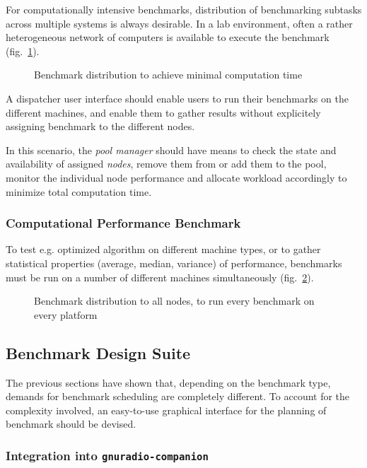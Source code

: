 \documentclass[a4paper]{IEEEtran}
\begin{document}
For computationally intensive benchmarks, distribution of benchmarking subtasks
across multiple systems is always desirable. In a lab environment, often a
rather heterogeneous network of computers is available to execute the benchmark
(fig.~\ref{fig:minimizetime}).

\begin{figure}[h] \small\centering 
\caption{\label{fig:minimizetime}Benchmark distribution to achieve minimal
computation time} \end{figure}

A dispatcher user interface should enable users to run their benchmarks on the
different machines, and enable them to gather results without explicitely
assigning benchmark to the different nodes.

In this scenario, the \emph{pool manager} should have means to check the state
and availability of assigned \emph{nodes}, remove them from or add them to the
pool, monitor the individual node performance and allocate workload accordingly
to minimize total computation time.

\subsubsection*{Computational Performance Benchmark} To test e.g. optimized
algorithm on different machine types, or to gather statistical properties
(average, median, variance) of performance, benchmarks must be run on a number
of different machines simultaneously (fig.~\ref{fig:runonall}).

\begin{figure}[h] \small\centering 
\caption{\label{fig:runonall}Benchmark distribution to all nodes, to run every
benchmark on every platform} \end{figure}

\subsection{Benchmark Design Suite}

The previous sections have shown that, depending on the benchmark type, demands
for benchmark scheduling are completely different. To account for the complexity
involved, an easy-to-use graphical interface for the planning of benchmark should
be devised.

\subsubsection*{Integration into \texttt{gnuradio-companion}}
\end{document}

